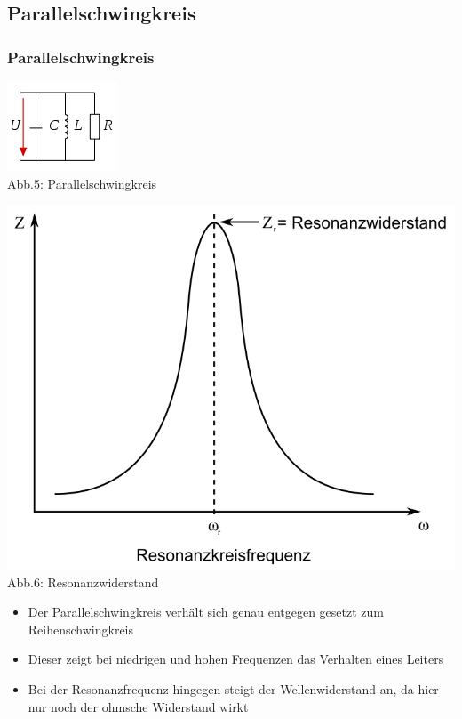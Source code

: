 \subsection*{Parallel\-schwing\-kreis}
\begin{frame}
  \frametitle{Parallelschwingkreis}
  \begin{center}
    \begin{minipage}{0.4\textwidth}
      \includegraphics[scale=1]{a04/Parallelschw.png}\\
      \tiny{Abb.5: Parallelschwingkreis \cite{wmen}}
    \end{minipage}
    \begin{minipage}{0.4\textwidth}
      \includegraphics[scale=0.2]{a04/ParallelschwSig.png}\\
      \tiny{Abb.6: Resonanzwiderstand \cite{wmen}}
    \end{minipage}
  \end{center}
  \begin{itemize}
    \item Der Parallelschwingkreis verhält sich genau entgegen gesetzt zum Reihenschwingkreis
    \item Dieser zeigt bei niedrigen und hohen Frequenzen das Verhalten eines Leiters
    \item Bei der Resonanzfrequenz hingegen steigt der Wellenwiderstand an, da hier nur noch der ohmsche Widerstand wirkt
  \end{itemize}
\end{frame}

